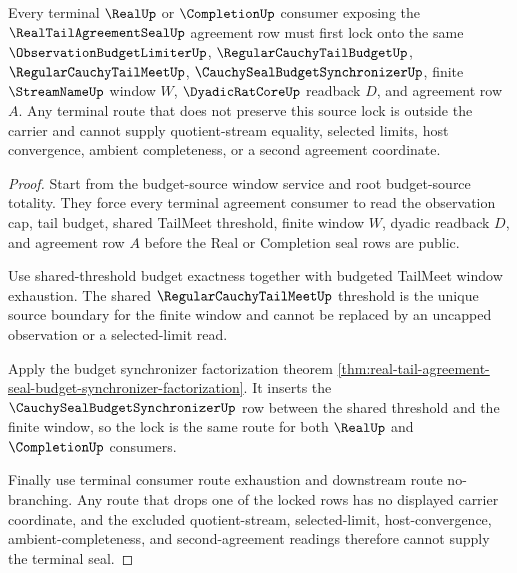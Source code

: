 \begin{theorem}
\label{thm:real-tail-agreement-seal-terminal-budget-source-lock}
Every terminal $\RealUp$ or $\CompletionUp$ consumer exposing the $\RealTailAgreementSealUp$ agreement row must first lock onto the same $\ObservationBudgetLimiterUp$, $\RegularCauchyTailBudgetUp$, $\RegularCauchyTailMeetUp$, $\CauchySealBudgetSynchronizerUp$, finite $\StreamNameUp$ window $W$, $\DyadicRatCoreUp$ readback $D$, and agreement row $A$. Any terminal route that does not preserve this source lock is outside the carrier and cannot supply quotient-stream equality, selected limits, host convergence, ambient completeness, or a second agreement coordinate.
\end{theorem}
\begin{proof}
Start from the budget-source window service and root budget-source totality. They force every terminal agreement consumer to read the observation cap, tail budget, shared TailMeet threshold, finite window $W$, dyadic readback $D$, and agreement row $A$ before the Real or Completion seal rows are public.

Use shared-threshold budget exactness together with budgeted TailMeet window exhaustion. The shared $\RegularCauchyTailMeetUp$ threshold is the unique source boundary for the finite window and cannot be replaced by an uncapped observation or a selected-limit read.

Apply the budget synchronizer factorization theorem \autoref{thm:real-tail-agreement-seal-budget-synchronizer-factorization}. It inserts the $\CauchySealBudgetSynchronizerUp$ row between the shared threshold and the finite window, so the lock is the same route for both $\RealUp$ and $\CompletionUp$ consumers.

Finally use terminal consumer route exhaustion and downstream route no-branching. Any route that drops one of the locked rows has no displayed carrier coordinate, and the excluded quotient-stream, selected-limit, host-convergence, ambient-completeness, and second-agreement readings therefore cannot supply the terminal seal.
\end{proof}


